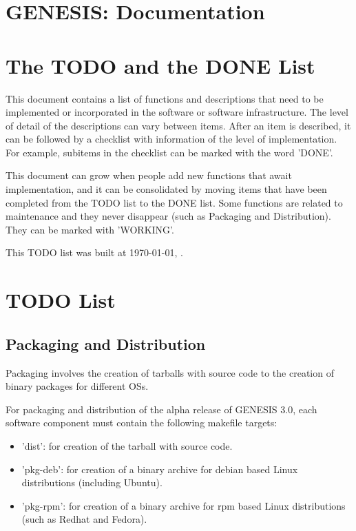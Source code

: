 \documentclass[12pt]{article}
\begin{document}
\section*{GENESIS: Documentation}

\section{The TODO and the DONE List}

This document contains a list of functions and descriptions that need
to be implemented or incorporated in the software or software
infrastructure.  The level of detail of the descriptions can vary
between items.  After an item is described, it can be followed by a
checklist with information of the level of implementation.  For
example, subitems in the checklist can be marked with the word 'DONE'.

This document can grow when people add new functions that await
implementation, and it can be consolidated by moving items that have
been completed from the TODO list to the DONE list.  Some functions
are related to maintenance and they never disappear (such as Packaging
and Distribution).  They can be marked with 'WORKING'.

This TODO list was built at \today, \thistime.


\section{TODO List}

\subsection{Packaging and Distribution}

Packaging involves the creation of tarballs with source code to the
creation of binary packages for different OSs.

For packaging and distribution of the alpha release of GENESIS 3.0,
each software component must contain the following makefile targets:

\begin{itemize}
\item 'dist': for creation of the tarball with source code.
\item 'pkg-deb': for creation of a binary archive for debian based
  Linux distributions (including Ubuntu).
\item 'pkg-rpm': for creation of a binary archive for rpm based Linux
  distributions (such as Redhat and Fedora).
\end{itemize}
\end{document}
